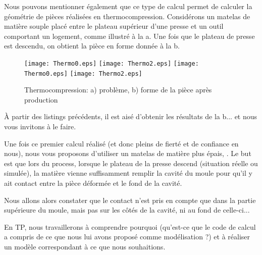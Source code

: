 \bigskip
Nous pouvons mentionner également que ce type de calcul permet de calculer la géométrie de pièces réalisées en thermocompression. Considérons un matelas de matière souple placé entre le plateau supérieur d'une presse et un outil comportant un logement, comme illustré à la a. Une fois que le plateau de presse est descendu, on obtient la pièce en forme donnée à la b.
\begin{figure}[ht]
  \center
  \ifVersionDuDocEstVincent
     \texttt{[image: Thermo0.eps]} \hfill
     \texttt{[image: Thermo2.eps]}
  \else
     \texttt{[image: Thermo0.eps]} \hfill
     \texttt{[image: Thermo2.eps]}
  \fi
  \caption{\label{Fig-Thermo} Thermocompression: a) problème, b) forme de la pièce après production}
\end{figure}

\medskip
À partir des listings précédents, il est aisé d'obtenir les résultats de la b... et nous vous invitons à le faire.

\medskip
Une fois ce premier calcul réalisé (et donc pleins de fierté et de confiance en nous), nous vous proposons d'utiliser un matelas de matière plus épais, . Le but est que lors du process, lorsque le plateau de la presse descend (situation réelle ou simulée), la matière vienne suffisamment remplir la cavité du moule pour qu'il y ait contact entre la pièce déformée et le fond de la cavité.

\bigskip
Nous allons alors constater que le contact n'est pris en compte que dans la partie supérieure du moule, mais pas sur les côtés de la cavité, ni au fond de celle-ci...

En TP, nous travaillerons à comprendre pourquoi (qu'est-ce que le code de calcul a compris de ce que nous lui avons proposé comme modélisation ?) et à réaliser un modèle correspondant à ce que nous souhaitions.
